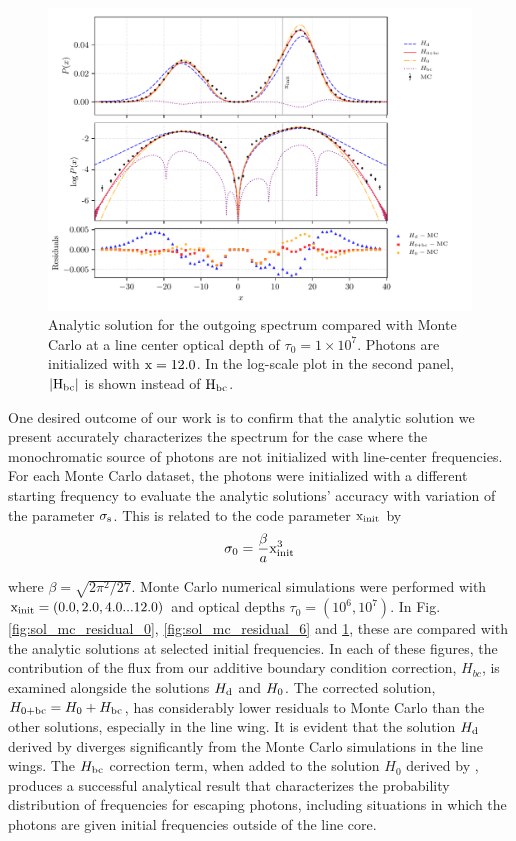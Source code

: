 \documentclass[onecolumn]{aastex63}
\begin{document}
\begin{figure}
    \centering
    \includegraphics{pdf_xinit12.pdf}
    \caption{Analytic solution for the outgoing spectrum compared with Monte Carlo at a line center optical depth of $\tau_0 = 1 \times 10^7$. Photons are initialized with $\rm x = 12.0$. In the log-scale plot in the second panel, $|\rm H_{bc}|$ is shown instead of $\rm H_{bc}$.} 
    \label{fig:sol_mc_residual_12}
\end{figure}

One desired outcome of our work is to confirm that the analytic solution we present accurately characterizes the spectrum for the case where the monochromatic source of photons are not initialized with line-center frequencies. For each Monte Carlo dataset, the photons were initialized with a different starting frequency to evaluate the analytic solutions' accuracy with variation of the parameter $\rm \sigma_s$. This is related to the code parameter $\rm x_{init}$ by 
\begin{equation} \label{sigma0_xinit}
    \sigma_0 = \frac{\beta}{a} \rm x_{init}^3
\end{equation}

where $\beta = \sqrt{2 \pi ^2 / 27}$. Monte Carlo numerical simulations were performed with $\rm x_{init} = (0.0, 2.0, 4.0 ... 12.0)$ and optical depths $\tau_0 = (10^6, 10^7)$. In Fig. \ref{fig:sol_mc_residual_0}, \ref{fig:sol_mc_residual_6} and \ref{fig:sol_mc_residual_12}, these are compared with the analytic solutions at selected initial frequencies. In each of these figures, the contribution of the flux from our additive boundary condition correction, $H_{bc}$, is examined alongside the solutions $H_{\rm d}$ and $H_{\rm 0}$. The corrected solution, $H_{\rm 0 + bc} = H_{\rm 0} + H_{\rm bc}$, has considerably lower residuals to Monte Carlo than the other solutions, especially in the line wing. It is evident that the solution $H_{\rm d}$ derived by \citet{harrington1973} diverges significantly from the Monte Carlo simulations in the line wings. The $H_{\rm bc}$ correction term, when added to the solution $H_0$ derived by \citet{2006ApJ...649...14D}, produces a successful analytical result that characterizes the probability distribution of frequencies for escaping photons, including situations in which the photons are given initial frequencies outside of the line core.
\end{document}
